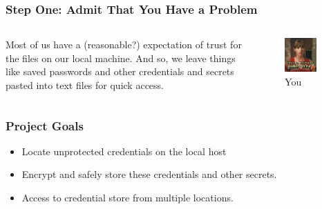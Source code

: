 \documentclass[aspectratio=169]{beamer}
\begin{document}
\begin{frame}
    \frametitle{Step One: Admit That You Have a Problem}

    \begin{columns}

        Most of us have a (reasonable?) expectation of trust for the files on our local machine. And so, we leave things like saved passwords and other credentials and secrets pasted into text files for quick access.

        \begin{figure}
            \centering
            \includegraphics[width=0.77\textwidth]{../static/images/problem.jpg}
            \caption{You}
            \label{fig:question}
        \end{figure}

    \end{columns}


\end{frame}

\begin{frame}
    \frametitle{Project Goals}
    \begin{itemize}
        \item Locate unprotected credentials on the local host
        \item Encrypt and safely store these credentials and other secrets.
        \item Access to credential store from multiple locations.
    \end{itemize}


\end{frame}
\end{document}
